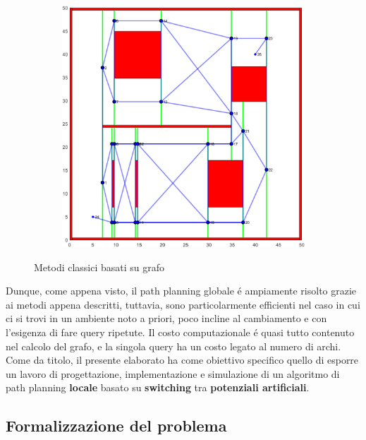 \documentclass[14pt,a4paper]{extarticle}
\begin{document}
\begin{figure}[H]
\begin{subfigure}[t]{0.5\textwidth}
\includegraphics[width=\textwidth]{celldecomp.png}
\label{celldecomp}
\end{subfigure}
\caption{Metodi classici basati su grafo}
\end{figure}
Dunque, come appena visto, il path planning globale é ampiamente risolto grazie ai metodi appena descritti, tuttavia, sono particolarmente efficienti nel caso in cui ci si trovi in un ambiente noto a priori, poco incline al cambiamento e con l'esigenza di fare query ripetute. Il costo computazionale é quasi tutto contenuto nel calcolo del grafo, e la singola query ha un costo legato al numero di archi.\\
Come da titolo, il presente elaborato ha come obiettivo specifico quello di esporre un lavoro di progettazione, implementazione e simulazione di un algoritmo di path planning \textbf{locale} basato su \textbf{switching} tra \textbf{potenziali artificiali}. 

\subsection{Formalizzazione del problema} \label{problema}
\end{document}
